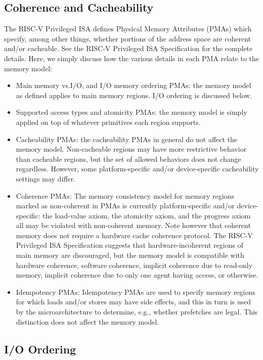 \subsection{Coherence and Cacheability}

The RISC-V Privileged ISA defines Physical Memory Attributes (PMAs) which specify, among other things, whether portions of the address space are coherent and/or cacheable.
See the RISC-V Privileged ISA Specification for the complete details.
Here, we simply discuss how the various details in each PMA relate to the memory model:

\begin{itemize}
  \item Main memory vs.\@ I/O, and I/O memory ordering PMAs: the memory model as defined applies to main memory regions.  I/O ordering is discussed below.
  \item Supported access types and atomicity PMAs: the memory model is simply applied on top of whatever primitives each region supports.
  \item Cacheability PMAs: the cacheability PMAs in general do not affect the memory model.  Non-cacheable regions may have more restrictive behavior than cacheable regions, but the set of allowed behaviors does not change regardless.  However, some platform-specific and/or device-specific cacheability settings may differ.
  \item Coherence PMAs: The memory consistency model for memory regions marked as non-coherent in PMAs is currently platform-specific and/or device-specific: the load-value axiom, the atomicity axiom, and the progress axiom all may be violated with non-coherent memory.  Note however that coherent memory does not require a hardware cache coherence protocol.  The RISC-V Privileged ISA Specification suggests that hardware-incoherent regions of main memory are discouraged, but the memory model is compatible with hardware coherence, software coherence, implicit coherence due to read-only memory, implicit coherence due to only one agent having access, or otherwise.
  \item Idempotency PMAs: Idempotency PMAs are used to specify memory regions for which loads and/or stores may have side effects, and this in turn is used by the microarchitecture to determine, e.g., whether prefetches are legal.  This distinction does not affect the memory model.
\end{itemize}


\subsection{I/O Ordering}

